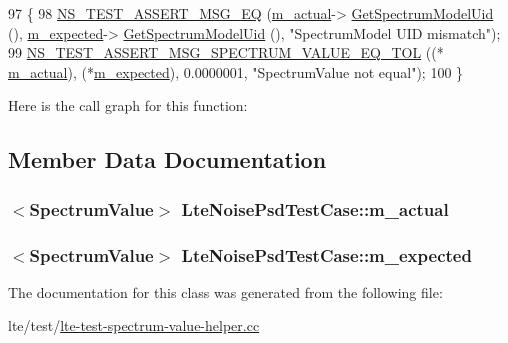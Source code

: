 \begin{DoxyCode}
97 \{
98   \hyperlink{group__testing_ga2a9d78cffb3db8e867c35fff0b698cf5}{NS\_TEST\_ASSERT\_MSG\_EQ} (\hyperlink{classLteNoisePsdTestCase_a87402c22cfa92d3c238bcfd5e4bf3b21}{m\_actual}->
      \hyperlink{classns3_1_1SpectrumValue_a13ebad7a54b23f2b05c01e442c1e66fd}{GetSpectrumModelUid} (), \hyperlink{classLteNoisePsdTestCase_a858ff02723481be581009d18fdb18cb1}{m\_expected}->
      \hyperlink{classns3_1_1SpectrumValue_a13ebad7a54b23f2b05c01e442c1e66fd}{GetSpectrumModelUid} (), \textcolor{stringliteral}{"SpectrumModel UID mismatch"});
99   \hyperlink{spectrum-test_8h_ac37d86c7027e04c671885b0f087ab7e0}{NS\_TEST\_ASSERT\_MSG\_SPECTRUM\_VALUE\_EQ\_TOL} ((*
      \hyperlink{classLteNoisePsdTestCase_a87402c22cfa92d3c238bcfd5e4bf3b21}{m\_actual}), (*\hyperlink{classLteNoisePsdTestCase_a858ff02723481be581009d18fdb18cb1}{m\_expected}), 0.0000001, \textcolor{stringliteral}{"SpectrumValue not equal"});
100 \}
\end{DoxyCode}


Here is the call graph for this function\+:




\subsection{Member Data Documentation}
\subsubsection[{\texorpdfstring{m\+\_\+actual}{m_actual}}]{$<${\bf Spectrum\+Value}$>$ Lte\+Noise\+Psd\+Test\+Case\+::m\+\_\+actual\hspace{0.3cm}{\ttfamily [protected]}}\hypertarget{classLteNoisePsdTestCase_a87402c22cfa92d3c238bcfd5e4bf3b21}{}\label{classLteNoisePsdTestCase_a87402c22cfa92d3c238bcfd5e4bf3b21}
\subsubsection[{\texorpdfstring{m\+\_\+expected}{m_expected}}]{$<${\bf Spectrum\+Value}$>$ Lte\+Noise\+Psd\+Test\+Case\+::m\+\_\+expected\hspace{0.3cm}{\ttfamily [protected]}}\hypertarget{classLteNoisePsdTestCase_a858ff02723481be581009d18fdb18cb1}{}\label{classLteNoisePsdTestCase_a858ff02723481be581009d18fdb18cb1}


The documentation for this class was generated from the following file\+:\begin{DoxyCompactItemize}
\item 
lte/test/\hyperlink{lte-test-spectrum-value-helper_8cc}{lte-\/test-\/spectrum-\/value-\/helper.\+cc}\end{DoxyCompactItemize}
